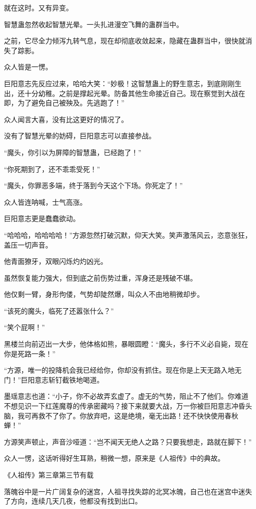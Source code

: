 \begin{this_body}
就在这时。又有异变。

智慧蛊忽然收起智慧光晕。一头扎进漫空飞舞的蛊群当中。

之前，它尽全力倾泻九转气息，现在却彻底收敛起来，隐藏在蛊群当中，很快就消失了踪影。

众人皆是一愣。

巨阳意志先反应过来，哈哈大笑：“妙极！这智慧蛊上的野生意志，到底刚刚生出，还十分幼稚。之前是撑起光晕。防备其他生命接近自己。现在察觉到大战在即，为了避免自己被殃及。先逃跑了！”

众人闻言大喜，没有比这更好的情况了。

没有了智慧光晕的妨碍，巨阳意志可以直接参战。

“魔头，你引以为屏障的智慧蛊，已经跑了！”

“你死期到了，还不乖乖受死！”

“魔头，你罪恶多端，终于落到今天这个下场。你死定了！”

众人皆连呐喊，士气高涨。

巨阳意志更是蠢蠢欲动。

“哈哈哈，哈哈哈哈！”方源忽然打破沉默，仰天大笑。笑声激荡风云，恣意张狂，盖压一切声音。

他青面獠牙，双眼闪烁灼灼凶光。

虽然恢复能力强大，但到底之前伤势过重，浑身还是残破不堪。

他仅剩一臂，身形佝偻，气势却陡然爆，叫众人不由地稍微却步。

“该死的魔头，临死了还嚣张什么？”

“笑个屁啊！”

黑楼兰向前迈出一大步，他体格如熊，暴眼圆瞪：“魔头，多行不义必自毙，现在你是死路一条！”

“方源，唯一的投降机会我已经给你，你却没有抓住。现在你是上天无路入地无门！”巨阳意志斩钉截铁地喝道。

墨瑶意志也道：“小子，你不必故弄玄虚了。虚无的气势，阻止不了他们。你难道不想见识一下红莲魔尊的传承密藏吗？接下来就要大战，万一你被巨阳意志冲昏头脑，我可再救不了你了。你放弃吧，这是绝境，毫无出路！还不快快使用春秋蝉！”

方源笑声顿止，声音沙哑道：“岂不闻天无绝人之路？只要我想走，路就在脚下！”

众人一愣，这话听得好生耳熟，稍微一想，原来是《人祖传》中的典故。

《人祖传》第三章第三节有载

落魄谷中是一片广阔复杂的迷宫，人祖寻找失踪的北冥冰魄，自己也在迷宫中迷失了方向，连续几天几夜，他都没有找到出口。


\end{this_body}
